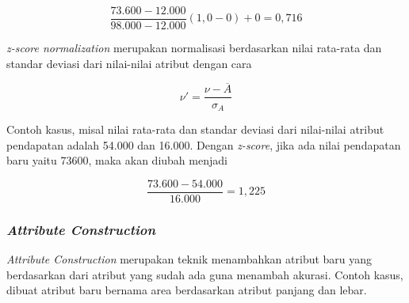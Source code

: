 \begin{displaymath}
\frac{73.600-12.000}{98.000-12.000} (1,0-0)+0 = 0,716
\end{displaymath}

\textsl{z-score normalization} merupakan normalisasi berdasarkan nilai rata-rata dan standar deviasi dari nilai-nilai atribut dengan cara

\begin{displaymath}
\nu' = \frac{\nu-\overline{A}}{\sigma_{A}}
\end{displaymath}

Contoh kasus, misal nilai rata-rata dan standar deviasi dari nilai-nilai atribut pendapatan adalah 54.000 dan 16.000. Dengan \textsl{z-score}, jika ada nilai pendapatan baru yaitu 73600, maka akan diubah menjadi

\begin{displaymath}
\frac{73.600-54.000}{16.000} = 1,225 
\end{displaymath}

\subsubsection{\textsl{Attribute Construction}}
\textsl{Attribute Construction} merupakan teknik menambahkan atribut baru yang berdasarkan dari atribut yang sudah ada guna menambah akurasi. Contoh kasus, dibuat atribut baru bernama area berdasarkan atribut panjang dan lebar. 


